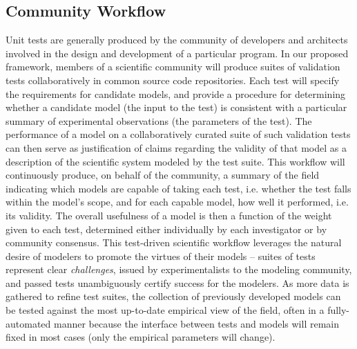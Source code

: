 \documentclass[a4paper,12pt]{article}
\begin{document}
\subsection{Community Workflow}
Unit tests are generally produced by the community of developers and architects involved in the design and development of a particular program. In our proposed framework, members of a scientific community will produce suites of validation tests collaboratively in common source code repositories. Each test will specify the requirements for candidate models, and provide a procedure for determining whether a candidate model (the input to the test) is consistent with a particular summary of experimental observations (the parameters of the test). The performance of a model on a collaboratively curated suite of such validation tests can then serve as justification of claims regarding the validity of that model as a description of the scientific system modeled by the test suite. This workflow will continuously produce, on behalf of the community, a summary of the field indicating which models are capable of taking each test, i.e. whether the test falls within the model's scope, and for each capable model, how well it performed, i.e. its validity.  The overall usefulness of a model is then a function of the weight given to each test, determined either individually by each investigator or by community consensus. This test-driven scientific workflow leverages the natural desire of modelers to promote the virtues of their models -- suites of tests represent clear \emph{challenges}, issued by experimentalists to the modeling community, and passed tests unambiguously certify success for the modelers. As more data is gathered to refine test suites, the collection of previously developed models can be tested against the most up-to-date empirical view of the field, often in a fully-automated manner because the interface between tests and models will remain fixed in most cases (only the empirical parameters will change).
\end{document}
